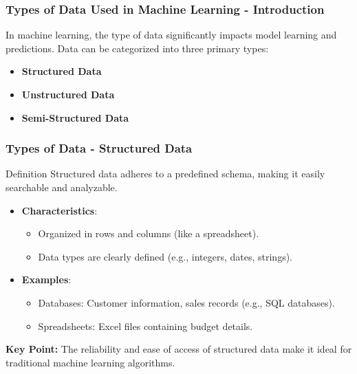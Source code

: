 \documentclass[aspectratio=169]{beamer}
\begin{document}
\begin{frame}[fragile]
    \frametitle{Types of Data Used in Machine Learning - Introduction}
    In machine learning, the type of data significantly impacts model learning and predictions. Data can be categorized into three primary types:
    \begin{itemize}
        \item \textbf{Structured Data}
        \item \textbf{Unstructured Data}
        \item \textbf{Semi-Structured Data}
    \end{itemize}
\end{frame}

\begin{frame}[fragile]
    \frametitle{Types of Data - Structured Data}
    \begin{block}{Definition}
        Structured data adheres to a predefined schema, making it easily searchable and analyzable.
    \end{block}
    \begin{itemize}
        \item \textbf{Characteristics}:
            \begin{itemize}
                \item Organized in rows and columns (like a spreadsheet).
                \item Data types are clearly defined (e.g., integers, dates, strings).
            \end{itemize}
        \item \textbf{Examples}:
            \begin{itemize}
                \item Databases: Customer information, sales records (e.g., SQL databases).
                \item Spreadsheets: Excel files containing budget details.
            \end{itemize}
    \end{itemize}
    \textbf{Key Point:} The reliability and ease of access of structured data make it ideal for traditional machine learning algorithms.
\end{frame}
\end{document}
